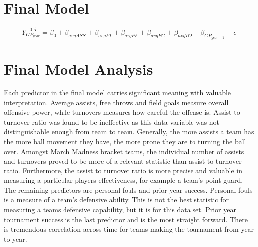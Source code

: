 \documentclass[]{scrartcl}
\begin{document}
\section*{Final Model}
	\[
Y_{GP_{year}}^{-0.5} = \beta_0 + \beta_{avgASS} +\beta_{avgFT} + \beta_{avgPF} + \beta_{avgFG} + \beta_{avgTO} + \beta_{GP_{year-1}}+ \epsilon 
\]
\section*{Final Model Analysis}
Each predictor in the final model carries significant meaning with valuable interpretation. Average assists, free throws and field goals measure overall offensive power, while turnovers measures how careful the offense is. Assist to turnover ratio was found to be ineffective as this data variable was not distinguishable enough from team to team. Generally, the more assists a team has the more ball movement they have, the more prone they are to turning the ball over. Amongst March Madness bracket teams, the individual number of assists and turnovers proved to be more of a relevant statistic than assist to turnover ratio. Furthermore, the assist to turnover ratio is more precise and valuable in measuring a particular players effectiveness, for example a team's point guard. The remaining predictors are personal fouls and prior year success. Personal fouls is a measure of a team's defensive ability. This is not the best statistic for measuring a teams defensive capability, but it is for this data set. Prior year tournament success is the last predictor and is the most straight forward. There is tremendous correlation across time for teams making the tournament from year to year.
\end{document}
